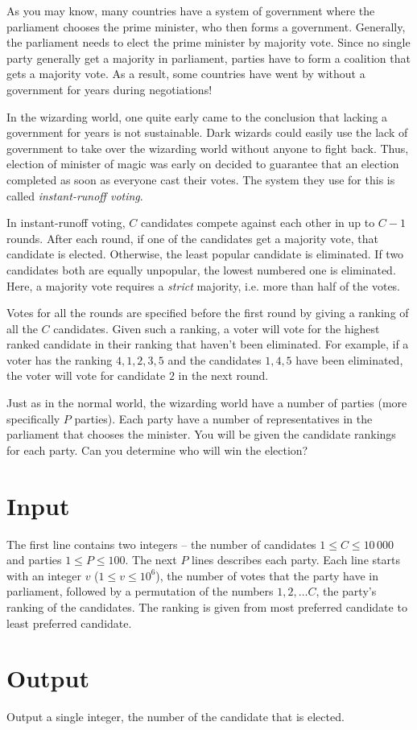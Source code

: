 As you may know, many countries have a system of government where the parliament chooses the prime minister, who then forms a government.
Generally, the parliament needs to elect the prime minister by majority vote.
Since no single party generally get a majority in parliament, parties have to form a coalition that gets a majority vote.
As a result, some countries have went by without a government for years during negotiations!

In the wizarding world, one quite early came to the conclusion that lacking a government for years is not sustainable.
Dark wizards could easily use the lack of government to take over the wizarding world without anyone to fight back.
Thus, election of minister of magic was early on decided to guarantee that an election completed as soon as everyone cast their votes.
The system they use for this is called \emph{instant-runoff voting}.

In instant-runoff voting, $C$ candidates compete against each other in up to $C - 1$ rounds.
After each round, if one of the candidates get a majority vote, that candidate is elected.
Otherwise, the least popular candidate is eliminated.
If two candidates both are equally unpopular, the lowest numbered one is eliminated.
Here, a majority vote requires a \emph{strict} majority, i.e. more than half of the votes.

Votes for all the rounds are specified before the first round by giving a ranking of all the $C$ candidates.
Given such a ranking, a voter will vote for the highest ranked candidate in their ranking that haven't been eliminated.
For example, if a voter has the ranking $4, 1, 2, 3, 5$ and the candidates $1, 4, 5$ have been eliminated, the voter will vote for candidate $2$ in the next round.

Just as in the normal world, the wizarding world have a number of parties (more specifically $P$ parties).
Each party have a number of representatives in the parliament that chooses the minister.
You will be given the candidate rankings for each party.
Can you determine who will win the election?

\section*{Input}
The first line contains two integers -- the number of candidates $1 \le C \le 10\,000$ and parties $1 \le P \le 100$.
The next $P$ lines describes each party.
Each line starts with an integer $v$ ($1 \le v \le 10^6$), the number of votes that the party have in parliament, followed by a permutation of the numbers $1, 2, \dots C$, the party's ranking of the candidates.
The ranking is given from most preferred candidate to least preferred candidate.

\section*{Output}
Output a single integer, the number of the candidate that is elected.
